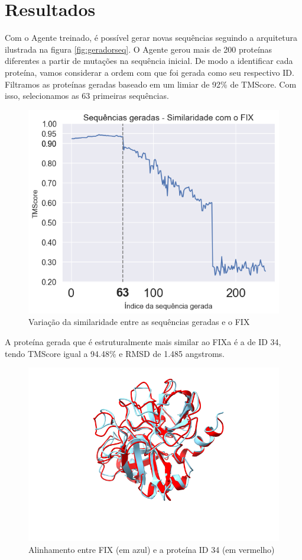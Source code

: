 \chapter{Resultados}

Com o Agente treinado, é possível gerar novas sequências seguindo a arquitetura 
ilustrada na figura \ref{fig:geradorseq}. 
O Agente gerou mais de 200 proteínas diferentes a partir de mutações na sequência inicial. 
De modo a identificar cada proteína, 
vamos considerar a ordem com que foi gerada como seu respectivo ID.
Filtramos as proteínas geradas baseado em um limiar de 92\% de TMScore.
Com isso, selecionamos as 63 primeiras sequências.  

\begin{figure}[H]
    \centering
    \includegraphics[width=.6\linewidth]{figuras/plot_tmscore_decreasing.png}    
    \caption{Variação da similaridade entre as sequências geradas e o FIX }
    \label{fig:tmscore_decreasing}
  \end{figure}


A proteína gerada que é estruturalmente mais similar ao FIXa é a de ID 34,
tendo TMScore igual a 94.48\% e RMSD de 1.485 angstroms. 

\begin{figure}[H]
    \centering
    \includegraphics[width=.6\linewidth]{figuras/FIXvsID34.png}    
    \caption{Alinhamento entre FIX (em azul) e a proteína ID 34 (em vermelho)}
    \label{fig:FIX_vs_ID34}
\end{figure}

